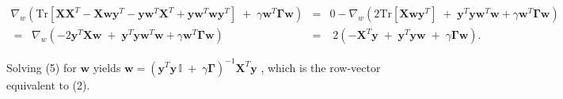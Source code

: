 \documentclass{article}
\let\vec\mathbf
\begin{document}
\begin{eqnarray*}
 \nabla_w \left(\textrm{Tr} \left[\vec X \vec X^T -  \vec X \vec w \vec y^T - \vec y \vec w^T \vec X^T + \vec y \vec w^T \vec w \vec y^T\right] \;+\; \gamma \vec w^T \boldsymbol{\Gamma} \vec w\right)
 &=& 0 - \nabla_w \left(2\textrm{Tr}\left[ \vec X \vec w \vec y^T\right]\;+\;\vec y^T \vec y \vec w^T \vec w + \gamma \vec w^T \boldsymbol{\Gamma} \vec w\right)\\
=\;\; \nabla_w \left( - 2\vec y^T \vec X \vec w \;+\; \vec y^T \vec y \vec w^T \vec w + \gamma \vec w^T \boldsymbol{\Gamma} \vec w  \right)\;&=&\;2\left(- \vec X^T \vec y\;+\;\vec y^T \vec y\vec w\;+\;\gamma \boldsymbol{\Gamma} \vec w\right).
\end{eqnarray*}

\noindent Solving (5) for $\vec w$ yields $\vec w = (\vec y^T \vec y \,\mathbb{I}\;+\; \gamma \boldsymbol{\Gamma})^{-1}\vec X^T \vec y$ , which is the row-vector equivalent to (2).
\end{document}
